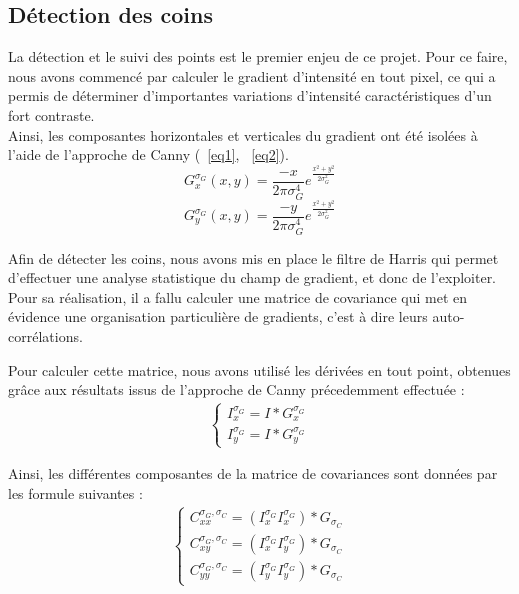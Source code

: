 \documentclass[blue]{ceri/sty/rapport}
\begin{document}
\subsection{Détection des coins}
\label{sec:OptionsClasse1}

 La détection et le suivi des points est le premier enjeu de ce projet. 
 Pour ce faire, nous avons commencé par calculer le gradient d'intensité en tout pixel, ce qui a permis de déterminer d'importantes variations d'intensité caractéristiques d'un fort contraste. \\
 Ainsi, les composantes horizontales et verticales du gradient ont été isolées à l'aide de l'approche de Canny (~\eqref{eq1}, ~\eqref{eq2}).
\begin{equation}
\label{eq1}
G_{x} ^{\sigma_G}(x,y)=  \frac{-x}{2\pi\sigma_G^4}e^\frac{x^2+y^2}{2\sigma_G^2}
\end{equation}
\begin{equation}
\label{eq2}
G_{y}^{\sigma_G}(x,y)=  \frac{-y}{2\pi\sigma_G^4}e^\frac{x^2+y^2}{2\sigma_G^2}
\end{equation}

Afin de détecter les coins, nous avons mis en place le filtre de Harris qui permet d'effectuer une analyse statistique du champ de gradient, et donc de l'exploiter. Pour sa réalisation, il a fallu calculer une  matrice de covariance qui met en évidence une organisation particulière de gradients, c'est à dire leurs auto-corrélations.

Pour calculer cette matrice, nous avons utilisé les dérivées en tout point, obtenues grâce aux résultats issus de l'approche de Canny précedemment effectuée : 
\begin{align}
\left\{
    \begin{array}{l}
        I_{x}^{\sigma_{G}} = I * G_{x}^{\sigma_{G}} \\
        I_{y}^{\sigma_{G}} = I * G_{y}^{\sigma_{G}}
    \end{array}
\right.
\end{align}

Ainsi, les différentes composantes de la matrice de covariances sont données par les formule suivantes : 
\begin{align}
\left\{
    \begin{array}{l}
        C_{xx}^{\sigma_G,\sigma_C} = (I_{x}^{\sigma_G}I_{x}^{\sigma_G})*G_{\sigma_{C}} \\
        C_{xy}^{\sigma_G,\sigma_C} = (I_{x}^{\sigma_G}I_{y}^{\sigma_G})*G_{\sigma_{C}} \\
        C_{yy}^{\sigma_G,\sigma_C} = (I_{y}^{\sigma_G}I_{y}^{\sigma_G})*G_{\sigma_{C}}
    \end{array}
\right.
\end{align}
\end{document}

